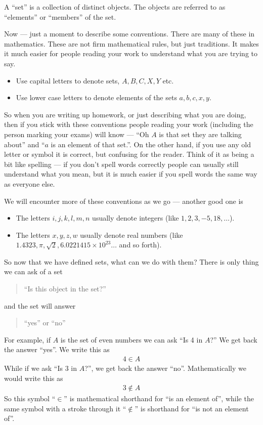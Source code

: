 \begin{defn}
 A ``set'' is a collection of distinct objects. The objects are referred to as
``elements'' or ``members'' of the set.
\end{defn}

Now --- just a moment to describe some conventions. There are many of these in
mathematics. These are not firm mathematical rules, but just traditions. It
makes it much easier for people reading your work to understand what you are
trying to say.
\begin{itemize}
\item Use capital letters to denote sets, $A,B, C, X, Y$ etc.
\item Use lower case letters to denote elements of the sets $a,b,c,x,y$.
\end{itemize}
So when you are writing up homework, or just describing what you are
doing, then if you stick with these conventions people reading your work
(including the person marking your exams) will know --- ``Oh $A$ is that set
they are talking about'' and ``$a$ is an element of that set.''. On the other
hand, if you use any old letter or symbol it is correct, but confusing for the
reader. Think of it as being a bit like spelling --- if you don't spell words
correctly people can usually still understand what you mean, but it is much easier if
you spell words the same way as everyone else.

We will encounter more of these conventions as we go --- another good one is
\begin{itemize}
\item The letters $i,j,k,l,m,n$ usually denote integers (like
$1,2,3,-5,18,\dots$).
\item The letters $x,y,z,w$ usually denote real numbers (like $1.4323, \pi,
\sqrt{2}, 6.0221415\times 10^{23} \dots$ and so forth).
\end{itemize}

So now that we have defined sets, what can we do with them? There is only thing
we can ask of a set
\begin{quote}
``Is this object in the set?''
\end{quote}
and the set will answer
\begin{quote}
  ``yes'' or ``no''
\end{quote}
For example, if $A$ is the set of even numbers we can ask ``Is 4 in $A$?'' We
get back the answer ``yes''. We write this as
\begin{align*}
  4 \in A
\end{align*}
While if we ask  ``Is $3$ in $A$?'', we get back the answer ``no''.
Mathematically we would write this as
\begin{align*}
  3 \notin A
\end{align*}
So this symbol ``$\in$'' is mathematical shorthand for ``is an element of'',
while the same symbol with a stroke through it ``$\notin$'' is shorthand for
``is not an element of''.

